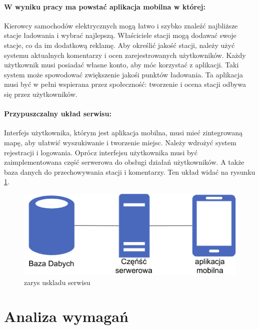 \paragraph{W wyniku pracy ma powstać aplikacja mobilna w której:}
Kierowcy samochodów elektrycznych mogą łatwo i szybko znaleźć najbliższe stacje ładowania i wybrać najlepszą.
Właściciele stacji mogą dodawać swoje stacje, co da im dodatkową reklamę.
Aby określić jakość stacji, należy użyć systemu aktualnych komentarzy i ocen zarejestrowanych użytkowników.
Każdy użytkownik musi posiadać własne konto, aby móc korzystać z aplikacji.
Taki system może spowodować zwiększenie jakośi punktów ładowania.
Ta aplikacja musi być w pełni wspierana przez społeczność: tworzenie i ocena stacji odbywa się przez użytkowników.

\paragraph{Przypuszczalny układ serwisu:}
Interfejs użytkownika, którym jest aplikacja mobilna, musi mieć zintegrowaną mapę, aby ułatwić wyszukiwanie i tworzenie miejsc.
Należy wdrożyć system rejestracji i logowania.
Oprócz interfejsu użytkownika musi być zaimplementowana część serwerowa do obsługi działań użytkowników.
A także baza danych do przechowywania stacji i komentarzy. Ten układ widać na rysunku \ref{fig:zarysuskladuserwisu}.
\begin{figure}[ht]
    \centering
        \includegraphics[width=0.4\linewidth]{rys02/uklad_wstepny.png}
        \caption{zarys uskladu serwisu \cite{diagrams_net}}
    \label{fig:zarysuskladuserwisu}
\end{figure}\newline
\newpage
\section{Analiza wymagań}
